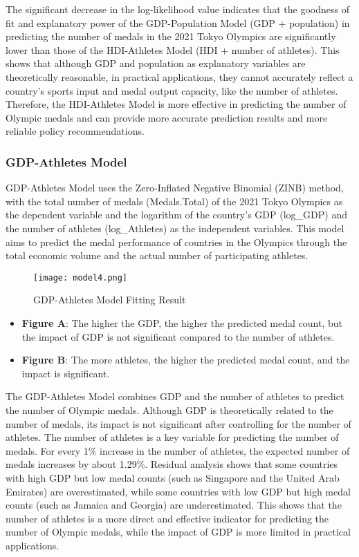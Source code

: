 \documentclass[11pt,twoside]{article}
\numberwithin{Theorem}{section}
\numberwithin{Definition}{section}
\numberwithin{Lemma}{section}
\numberwithin{Algorithm}{section}
\numberwithin{equation}{section}
\begin{document}
The significant decrease in the log-likelihood value indicates that the goodness of fit and explanatory power of the GDP-Population Model (GDP + population) in predicting the number of medals in the 2021 Tokyo Olympics are significantly lower than those of the HDI-Athletes Model (HDI + number of athletes). This shows that although GDP and population as explanatory variables are theoretically reasonable, in practical applications, they cannot accurately reflect a country's sports input and medal output capacity, like the number of athletes. Therefore, the HDI-Athletes Model is more effective in predicting the number of Olympic medals and can provide more accurate prediction results and more reliable policy recommendations.

\subsubsection{GDP-Athletes Model}

GDP-Athletes Model uses the Zero-Inflated Negative Binomial (ZINB) method, with the total number of medals (Medals.Total) of the 2021 Tokyo Olympics as the dependent variable and the logarithm of the country's GDP (log_GDP) and the number of athletes (log_Athletes) as the independent variables. This model aims to predict the medal performance of countries in the Olympics through the total economic volume and the actual number of participating athletes.

\begin{figure}[!ht]
\centering
\texttt{[image: model4.png]}
\caption{GDP-Athletes Model Fitting Result}
\label{fig:model4}
\end{figure}

\begin{itemize}
    \item \textbf{Figure A}: The higher the GDP, the higher the predicted medal count, but the impact of GDP is not significant compared to the number of athletes.
    \item \textbf{Figure B}: The more athletes, the higher the predicted medal count, and the impact is significant.
\end{itemize}

The GDP-Athletes Model combines GDP and the number of athletes to predict the number of Olympic medals. Although GDP is theoretically related to the number of medals, its impact is not significant after controlling for the number of athletes. The number of athletes is a key variable for predicting the number of medals. For every 1\% increase in the number of athletes, the expected number of medals increases by about 1.29\%. Residual analysis shows that some countries with high GDP but low medal counts (such as Singapore and the United Arab Emirates) are overestimated, while some countries with low GDP but high medal counts (such as Jamaica and Georgia) are underestimated. This shows that the number of athletes is a more direct and effective indicator for predicting the number of Olympic medals, while the impact of GDP is more limited in practical applications.
\end{document}
